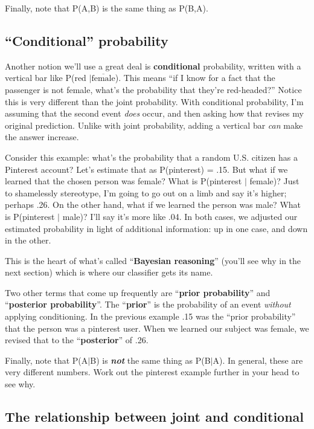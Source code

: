 Finally, note that P(A,B) is the same thing as P(B,A).

\subsection{``Conditional'' probability}

Another notion we'll use a great deal is \textbf{conditional} probability,
written with a vertical bar like P(red $| \overline{\textrm{female}}$). This
means ``if I know for a fact that the passenger is not female, what's the
probability that they're red-headed?'' Notice this is very different than the
joint probability. With conditional probability, I'm assuming that the second
event \textit{does} occur, and then asking how that revises my original
prediction. Unlike with joint probability, adding a vertical bar \textit{can}
make the answer increase.

Consider this example: what's the probability that a random U.S. citizen has a
Pinterest account? Let's estimate that as P(pinterest) = .15. But what if we
learned that the chosen person was female? What is P(pinterest $|$ female)? Just
to shamelessly stereotype, I'm going to go out on a limb and say it's higher;
perhaps .26. On the other hand, what if we learned the person was male? What
is P(pinterest $|$ male)? I'll say it's more like .04. In both cases, we
adjusted our estimated probability in light of additional information: up in
one case, and down in the other.

This is the heart of what's called ``\textbf{Bayesian reasoning}'' (you'll see
why in the next section) which is where our classifier gets its name.

Two other terms that come up frequently are ``\textbf{prior probability}'' and
``\textbf{posterior probability}''. The ``\textbf{prior}'' is the probability of
an event \textit{without} applying conditioning. In the previous example .15
was the ``prior probability'' that the person was a pinterest user. When we
learned our subject was female, we revised that to the ``\textbf{posterior}''
of .26.

Finally, note that P(A$|$B) is \textbf{\textit{not}} the same thing as
P(B$|$A). In general, these are very different numbers. Work out the pinterest
example further in your head to see why.

\subsection{The relationship between joint and conditional}


